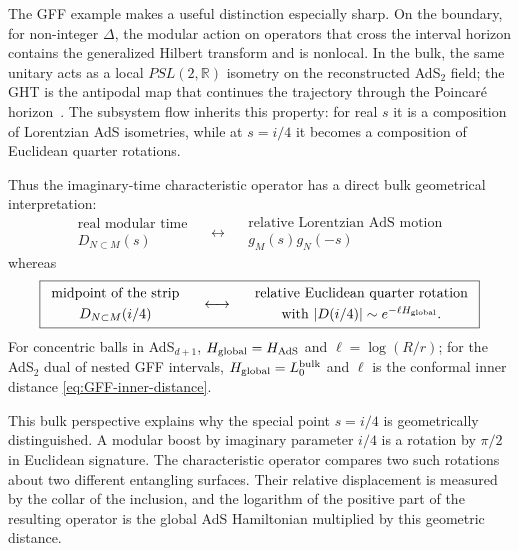\documentclass[a4paper,11pt]{article}
\theoremstyle{definition}
\begin{document}
The GFF example makes a useful distinction especially sharp. On the
boundary, for non-integer $\Delta$, the modular action on operators that
cross the interval horizon contains the generalized Hilbert transform and
is nonlocal. In the bulk, the same unitary acts as a local
$PSL(2,\mathbb R)$ isometry on the reconstructed AdS$_2$ field; the GHT
is the antipodal map that continues the trajectory through the Poincar\'e
horizon~\cite{LashkariLeungMoosaOuseph2025}. The subsystem flow inherits
this property: for real $s$ it is a composition of Lorentzian AdS
isometries, while at $s=i/4$ it becomes a composition of Euclidean
quarter rotations.

Thus the imaginary-time characteristic operator has a direct bulk
geometrical interpretation:
\begin{equation}
    \boxed{
    \begin{array}{c}
    \text{real modular time}
    \\[1mm]
    D_{N\subset M}(s)
    \end{array}
    \quad\longleftrightarrow\quad
    \begin{array}{c}
    \text{relative Lorentzian AdS motion}
    \\[1mm]
    g_M(s)g_N(-s)
    \end{array}
    }
\end{equation}
whereas
\begin{equation}
    \boxed{
    \begin{array}{c}
    \text{midpoint of the strip}
    \\[1mm]
    D_{N\subset M}(i/4)
    \end{array}
    \quad\longleftrightarrow\quad
    \begin{array}{c}
    \text{relative Euclidean quarter rotation}
    \\[1mm]
    \text{with }|D(i/4)|\sim e^{-\ell H_{\rm global}}
    .
    \end{array}
    }
\end{equation}
For concentric balls in AdS$_{d+1}$,
$H_{\rm global}=H_{\rm AdS}$ and
$\ell=\log(R/r)$; for the AdS$_2$ dual of nested GFF intervals,
$H_{\rm global}=L_0^{\rm bulk}$ and $\ell$ is the conformal inner distance
\eqref{eq:GFF-inner-distance}.

This bulk perspective explains why the special point $s=i/4$ is
geometrically distinguished. A modular boost by imaginary parameter
$i/4$ is a rotation by $\pi/2$ in Euclidean signature. The characteristic
operator compares two such rotations about two different entangling
surfaces. Their relative displacement is measured by the collar of the
inclusion, and the logarithm of the positive part of the resulting
operator is the global AdS Hamiltonian multiplied by this geometric
distance.
\end{document}
